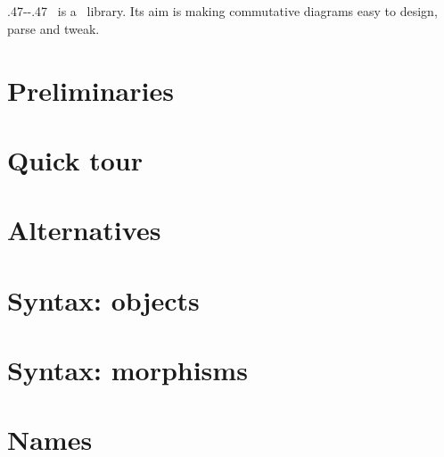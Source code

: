 




\thispagestyle{empty}
\noindent
{}\\[0.62em]
\\[1.62em]
\par
\vfill
{}


\newpage
\begin{adjustwidth}{.47\textwidth-\marginparwidth-\marginparsep}{.47\textwidth}
\noindent\CoDi\ is a \TikZ\ library. Its aim is\linebreak
making commutative diagrams\linebreak
easy to design, parse and tweak.\par
\end{adjustwidth}

\newpage
\section{Preliminaries}

\newpage
\section{Quick tour}

\newpage
\section{Alternatives}

\newpage
\section{Syntax: objects}

\newpage
\section{Syntax: morphisms}

\newpage
\section{Names}

\newpage
